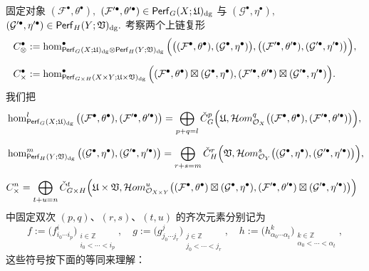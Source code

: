固定对象
$
(\mathcal{F}^{\bullet},\theta^{\bullet}),
$
$
(\mathcal{F}'^{\bullet},\theta'^{\bullet})
\in\operatorname{\mathsf{Perf}}_G(X;\mathfrak{U})_{\operatorname{\operatorname{dg}}}
$
与
$
(\mathcal{G}^{\bullet},\eta^{\bullet}),
$
$
(\mathcal{G}'^{\bullet},\eta'^{\bullet})
\in\operatorname{\mathsf{Perf}}_H(Y;\mathfrak{V})_{\operatorname{\operatorname{dg}}}.
$
考察两个上链复形
\begin{align*}
C_{\otimes}^{\bullet}
&:=
\hom_{
\operatorname{\mathsf{Perf}}_G(X;\mathfrak{U})_{\operatorname{\operatorname{dg}}}
\otimes
\operatorname{\mathsf{Perf}}_H(Y;\mathfrak{V})_{\operatorname{\operatorname{dg}}}
}^{\bullet}
\Big(
\big(
(\mathcal{F}^{\bullet},\theta^{\bullet}),
(\mathcal{G}^{\bullet},\eta^{\bullet})
\big),
\big(
(\mathcal{F}'^{\bullet},\theta'^{\bullet}),
(\mathcal{G}'^{\bullet},\eta'^{\bullet})
\big)
\Big),
\\[2mm]
C_{\times}^{\bullet}
&:=
\hom_{\operatorname{\mathsf{Perf}}_{G\times H}(X\times Y;\mathfrak{U}\times\mathfrak{V})_{\operatorname{\operatorname{dg}}}}^{\bullet}
\Big(
(\mathcal{F}^{\bullet},\theta^{\bullet})
\boxtimes
(\mathcal{G}^{\bullet},\eta^{\bullet}),
(\mathcal{F}'^{\bullet},\theta'^{\bullet})
\boxtimes
(\mathcal{G}'^{\bullet},\eta'^{\bullet})
\Big).
\end{align*}
我们把
\begin{align*}
\begin{split}
&
\hom_{\operatorname{\mathsf{Perf}}_{G}(X;\mathfrak{U})_{\operatorname{\operatorname{dg}}}}^l
\big(
(\mathcal{F}^{\bullet},\theta^{\bullet}),
(\mathcal{F}'^{\bullet},\theta'^{\bullet})
\big)
=
\bigoplus_{p+q=l}
\check{C}_{G}^p
\Big(
\mathfrak{U},
\mathcal{H}om_{\mathcal{O}_X}^q
\big(
(\mathcal{F}^{\bullet},\theta^{\bullet}),
(\mathcal{F}'^{\bullet},\theta'^{\bullet})
\big)
\Big),
\\[2mm]
&
\hom_{\operatorname{\mathsf{Perf}}_{H}(Y;\mathfrak{V})_{\operatorname{\operatorname{dg}}}}^m
\big(
(\mathcal{G}^{\bullet},\eta^{\bullet}),
(\mathcal{G}'^{\bullet},\eta'^{\bullet})
\big)
=
\bigoplus_{r+s=m}
\check{C}_{H}^r
\Big(
\mathfrak{V},
\mathcal{H}om_{\mathcal{O}_Y}^s
\big(
(\mathcal{G}^{\bullet},\eta^{\bullet}),
(\mathcal{G}'^{\bullet},\eta'^{\bullet})
\big)
\Big),
\\[2mm]
&
C_{\times}^n
=
\bigoplus_{t+u=n}
\check{C}_{G\times H}^t
\Big(
\mathfrak{U}\times\mathfrak{V},
\mathcal{H}om_{\mathcal{O}_{X\times Y}}^u
\big(
(\mathcal{F}^{\bullet},\theta^{\bullet})
\boxtimes
(\mathcal{G}^{\bullet},\eta^{\bullet}),
(\mathcal{F}'^{\bullet},\theta'^{\bullet})
\boxtimes
(\mathcal{G}'^{\bullet},\eta'^{\bullet})
\big)
\Big)
\end{split}
\end{align*}
中固定双次 $(p,q)$、$(r,s)$、$(t,u)$ 的齐次元素分别记为
$$
f:=
\Big(f_{i_0\cdots i_p}^i\Big)
_{\substack{
i\in\mathbb{Z}
\\
i_0<\cdots<i_p
}},
\quad
g:=
\Big(g_{j_0\cdots j_r}^j\Big)
_{\substack{
j\in\mathbb{Z}
\\
j_0<\cdots<j_r
}},
\quad
h:=
\Big(h_{\alpha_0\cdots \alpha_t}^k\Big)
_{\substack{
k\in\mathbb{Z}
\\
\alpha_0<\cdots<\alpha_t
}},
$$
这些符号按下面的等同来理解：
